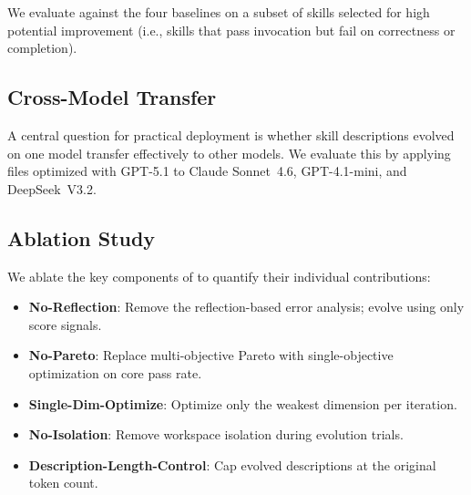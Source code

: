 
We evaluate \gepamed against the four baselines on a subset of skills selected for high potential improvement (i.e., skills that pass invocation but fail on correctness or completion).

\subsection{Cross-Model Transfer}
\label{ssec:cross_model}

A central question for practical deployment is whether skill descriptions evolved on one model transfer effectively to other models.
We evaluate this by applying \skillmd files optimized with GPT-5.1 to Claude Sonnet~4.6, GPT-4.1-mini, and DeepSeek~V3.2.


\subsection{Ablation Study}
\label{ssec:ablation}

\begin{table}[t]
\centering\small
\caption{Ablation study: contribution of each \gepamed component.}
\label{tab:ablation}
\end{table}

We ablate the key components of \gepamed to quantify their individual contributions:
\begin{itemize}[nosep,leftmargin=*]
  \item \textbf{No-Reflection}: Remove the reflection-based error analysis; evolve using only score signals.
  \item \textbf{No-Pareto}: Replace multi-objective Pareto with single-objective optimization on core pass rate.
  \item \textbf{Single-Dim-Optimize}: Optimize only the weakest dimension per iteration.
  \item \textbf{No-Isolation}: Remove workspace isolation during evolution trials.
  \item \textbf{Description-Length-Control}: Cap evolved descriptions at the original token count.
\end{itemize}

